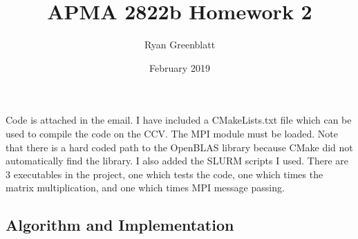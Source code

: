 \documentclass{article}
\title{APMA 2822b Homework 2}
\author{Ryan Greenblatt}
\date{February 2019}
\begin{document}
\setlength\parindent{0pt}

\renewcommand{\thesubsection}{\alph{subsection}}

\maketitle

\section{}

Code is attached in the email. I have included a CMakeLists.txt file which can be used to compile
the code on the CCV. The MPI module must be loaded. Note that there is a hard coded path to the OpenBLAS library 
because CMake did not automatically find the library. I also added the SLURM scripts I used.
There are 3 executables in the project, one which tests the code, one which times the matrix
multiplication, and one which times MPI message passing.

\subsection*{Algorithm and Implementation}
\end{document}
